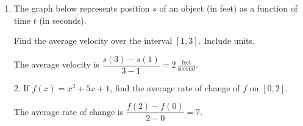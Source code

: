 \documentclass[11pt]{article}
\begin{document}
\pagestyle{empty}
\newsavebox{\quizfront}
\begin{lrbox}{\quizfront}
\begin{minipage}[top][4.5in][t]{\textwidth} \setlength{\parindent}{1.5em}
\drawtitle
\vspace{-0.5in}
\begin{enumerate}

\item The graph below represents position $s$ of an object (in feet)
  as a function of time $t$ (in seconds).
  \vspace{-.35in}
  \begin{center}
  \end{center}
  \vspace{-.25in}
  Find the average velocity over the interval $[1,3]$. Include units.
  \vfill
  
  {\color{blue} The average velocity is $\dfrac{s(3)-s(1)}{3-1} =
    2\,\frac{\text{feet}}{\text{second}}$.}

  \vfill

\end{enumerate}



\end{minipage}
\end{lrbox}

\newsavebox{\quizback}
\begin{lrbox}{\quizback}
\begin{minipage}[top][4.5in][t]{\textwidth} \setlength{\parindent}{1.5em}
\begin{itemize}
\item[2.] If $f(x) = x^2 + 5x + 1$, find the average rate of change of
  $f$ on $[0,2]$.

  \vfill
  {\color{blue}
    The average rate of change is $\dfrac{f(2)-f(0)}{2-0} = 7$.
  }
  \vfill


\end{itemize}
\end{minipage}
\end{lrbox}
\end{document}
